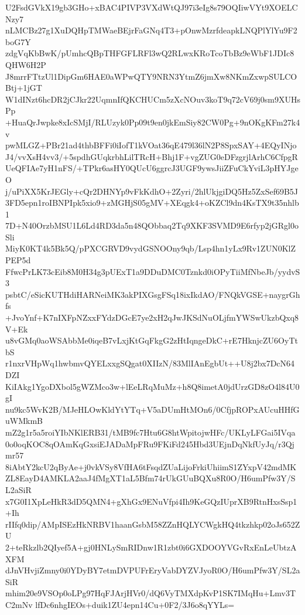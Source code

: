U2FsdGVkX19gb3GHo+xBAC4PIVP3VXdWtQJ97i3eIg8s79OQIiwVYt9XOELCNzy7
nLMCBz27g1XuDQHpTMWaeBEjrFaGNq4T3+pOnwMzrfdeapkLNQPlYlYu9F2boG7Y
zdgVqKbBwK/pUmhcQBpTHFGFLRFl3wQ2RLwxKRoTcoTbBz9eWbF1JDIc8QHW6H2P
J8mrrFTtzUl1DipGm6HAE0aWPwQTY9NRN3YtmZ6jmXw8NKmZxwpSULCOBtj+1jGT
W1dINzt6hcDR2jCJkr22UqmnIfQKCHUCm5zXcNOuv3koT9q72cV69j0sm9XUHsPp
+HuaQrJwpke8xIcSMjI/RLUzyk0Pp09t9en0jkEmSiy82CW0Pg+9nOKgKFm27k4v
pwMLGZ+PBr21ad4thbBFFi0iIofT1kVOat36qE479l36lN2P8SpxSAY+4EQyINjo
J4/vvXsH4vv3/+5spdhGUqkrbhLilTRcH+Bhj1F+vgZUG0eDFzgrjlArhC6CfpgR
UeQFIAe7yH1nFS/+TPkr6asHY0QUcU6ggrcJ3UGF9ywsJiiZFuCkYviL3pHYJgeO
j/uPiXX5KrJEGly+cQr2DHNYp9vFkKdhO+2Zyri/2hlUkjgiDQ5Hz5ZxSef69B5J
3FD5epn1roIBNPIpk5xio9+zMGHjS05gMV+XEqgk4+oKZCl9dn4KsTX9t35nhlb1
7D+N40OrzbMSU1L6Ld4RD3da5n48QObbaq2Tq9XKF3SVMD9E6rfyp2jGRgl0oSli
MiyK0KT4k5Bk5Q/pPXCGRVD9vydGSNOOny9qb/Lsp4hn1yLx9Rv1ZUN0KlZPEP5d
FfwcPrLK73cEib8M0H34g3pUExT1a9DDuDMC0Tznkd0iOPyTiiMfNbeJb/yydvS3
psbtC/eSicKUTHdiHARNeiMK3akPIXGsgFSq18ixIkdAO/FNQkVGSE+naygrGhfs
+JvoYnf+K7nIXFpNZxxFYdzDGcE7ye2xH2qJwJKSdNuOLjfmYWSwUkzbQxq8V+Ek
u8vGMq0aoWSAbbMe0iqeB7vLxjKtGqFkgG2zHtIqngeDkC+rE7HknjcZU6OyTtbS
r1nxrVHpWq1hwbmvQYELxxgSQgat0XIIzN/83MlIAnEgbUt++U8j2bx7DcN64DZI
KiIAkg1YgoDXbol5gWZMco3w+lEeLRqMuMz+h8Q8imetA0jdUrzGD8zO4l84U0gI
nu9kc5WvK2B/MJeHLOwKldYtYTq+V5aDUmHtMOn6/0CfjpROPxAUcuHHfGuWMkmB
mZ2g1r5a5roiYIbNKlERB31/tMB9fc7Htu6G8htWpitojwHFc/UKLyLFGai5IVqa
0o0oqKOC8qOAmKqGxsiEJADaMpFRu9FKiFd245Hbd3UEjnDqNkfUyJq/r3Qjmr57
8iAbtY2kcU2qByAe+j0vkVSy8VfHA6tFsqdZUaLijoFrkiUhiimS1ZYxpV42mdMK
ZL8EayD4AMKLA2aaJ4fMgXT1aL5Bfm74rUkGUuBQXu8R0O/H6umPfw3Y/SL2aSiR
x7G0I1XpLeHkR3dD5QMN4+gXhGx9ENuVfpi4Ih9KeGQzIUprXB9RtnHxsSsp1+Ih
rIIfq0dip/AMpISEzHkNRBV1haanGsbM58ZZnHQLYCWgkHQ4tkzhkp02oJs652ZU
2+teRkzlb2QIyef5A+gj0HNLySmRIDnw1R1zbt0i6GXDOOYVGvRxEnLeUbtzAXFM
dJnVHvjiZmny0i0YDyBY7etmDVPUFrEryVabDYZVJyoR0O/H6umPfw3Y/SL2aSiR
mhim20e9VSOp0oLPg97HqFJArjHVr0/dQ6VyTMXdpKvP1SK7IMqHu+Lmv3TC2mNv
lfDc6nhgIEOs+duik1ZU4epn14Cu+0F2/3J6o8qYYLs=
